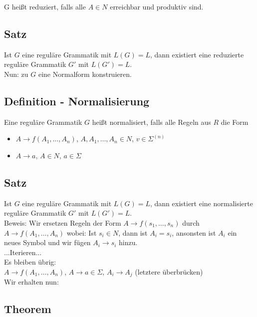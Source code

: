 \documentclass[titlepage]{article}
\begin{document}
G hei\ss t reduziert, falls alle $A \in N$ erreichbar und produktiv sind.

\subsection{Satz}

Ist $G$ eine regul\"are Grammatik mit $L(G) = L$, dann existiert eine reduzierte regul\"are 
Grammatik $G'$ mit $L(G') = L$.\\

Nun: zu $G$ eine \glqq Normalform \grqq konstruieren.

\subsection{Definition - Normalisierung}

Eine regul\"are Grammatik $G$ hei\ss t normalisiert, falls alle Regeln aus $R$ die Form
\begin{itemize}
	\item $A \to f(A_1, \dots, A_n)$, $A, A_1, \dots, A_n \in N$, $v \in \Sigma^{(n)}$
	\item $A \to a$, $A \in N$, $a \in \Sigma$
\end{itemize}

\subsection{Satz}

Ist $G$ eine regul\"are Grammatik mit $L(G) = L$, dann existiert eine normalisierte regul\"are 
Grammatik $G'$ mit $L(G') = L$.\\

Beweis: Wir ersetzen Regeln der Form 
$A \to f(s_1, \dots, s_n)$ durch
$A \to f(A_1, \dots, A_n)$ wobei:
Ist $s_i \in N$, dann ist $A_i= s_i$, ansonsten ist $A_i$ ein neues Symbol und wir f\"ugen 
$A_i \to s_i$ hinzu.\\
...Iterieren...\\

Es bleiben \"ubrig:\\
$A \to f(A_1, \dots, A_n)$, $A \to a \in \Sigma$, $A_i \to A_j$ (letztere \"uberbr\"ucken)\\

Wir erhalten nun:

\subsection{Theorem}
\end{document}
